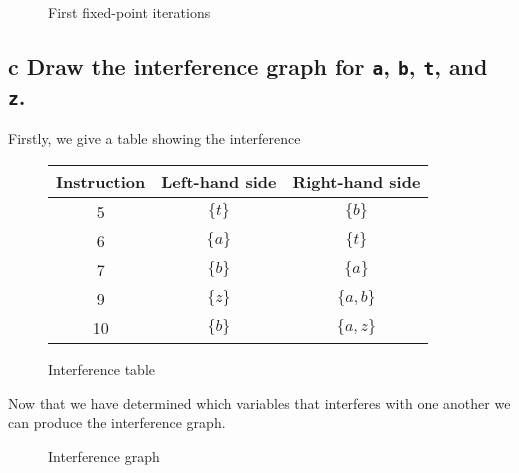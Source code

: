 \documentclass[11pt,a4paper]{article}
\begin{document}
\begin{figure}[H]
\begin{multicols}{3}
	\end{multicols}

	\label{fig:fixed-point-iterations}
	\caption{First fixed-point iterations}

\end{figure}

\subsection*{c \mdseries Draw the interference graph for {\tt a}, {\tt b},
{\tt t}, and {\tt z}.}
Firstly, we give a table showing the interference
\begin{figure}[H]

	\center
	\begin{tabular}{|c||c|c|}
		\hline
		{\bf Instruction}	& {\bf Left-hand side}	& {\bf Right-hand side}	\\ \hline
		5					& $\{t\}$				& $\{b\}$				\\ \hline
		6					& $\{a\}$				& $\{t\}$				\\ \hline
		7					& $\{b\}$				& $\{a\}$				\\ \hline
		9					& $\{z\}$				& $\{a,b\}$				\\ \hline
		10					& $\{b\}$				& $\{a,z\}$				\\ \hline
	\end{tabular}

	\label{fig:interference-table}
	\caption{Interference table}

\end{figure}
\newpage
Now that we have determined which variables that interferes with one another
we can produce the interference graph.
\begin{figure}[H]

	\center

	\label{fig:interference-graph}
	\caption{Interference graph}

\end{figure}
\end{document}
